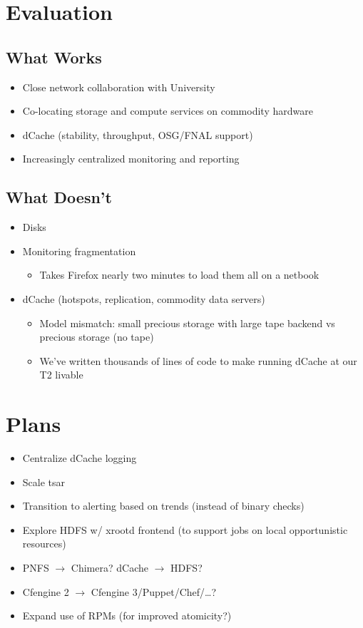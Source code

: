 \documentclass{beamer}
\begin{document}
\section{Evaluation}
\subsection{What Works}
\begin{frame}
\begin{itemize}
	\item Close network collaboration with University
	\item Co-locating storage and compute services on commodity hardware
	\item dCache (stability, throughput, OSG/FNAL support)
	\item Increasingly centralized monitoring and reporting
\end{itemize}
\end{frame}

\subsection{What Doesn't}
\begin{frame}
\begin{itemize}
	\item Disks
	\item Monitoring fragmentation
	\begin{itemize}
		\item Takes Firefox nearly two minutes to load them all on a netbook
	\end{itemize}
	\item dCache (hotspots, replication, commodity data servers)
	\begin{itemize}
		\item Model mismatch: small precious storage with large tape backend vs precious storage (no tape)
		\item We've written thousands of lines of code to make running dCache at our T2 livable
	\end{itemize}
\end{itemize}
\end{frame}

\section{Plans}
\begin{frame}
\begin{itemize}
	\item Centralize dCache logging
	\item Scale tsar
	\item Transition to alerting based on trends (instead of binary checks)
	\item Explore HDFS w/ xrootd frontend (to support jobs on local opportunistic resources)
	\item PNFS $\rightarrow$ Chimera? dCache $\rightarrow$ HDFS?
	\item Cfengine 2 $\rightarrow$ Cfengine 3/Puppet/Chef/\ldots{}?
	\item Expand use of RPMs (for improved atomicity?)
\end{itemize}
\end{frame}
\end{document}

